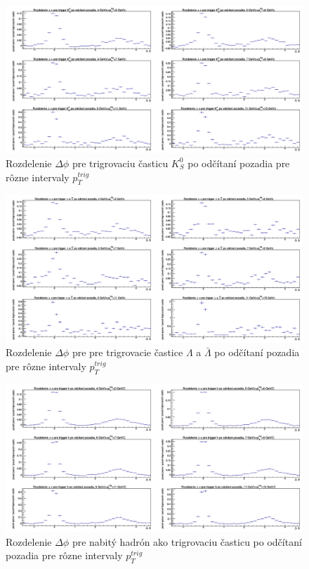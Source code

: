 \documentclass[thesismargins, thesislinespacing]{rnthesis}
\begin{document}
\begin{figure}[hbtp!]
	\centering
	\includegraphics[width=\textwidth]{./Obrazky_praca/DeltaPhiKH.png}
	\caption{Rozdelenie $\Delta \phi$ pre trigrovaciu časticu $K^0_S$ po odčítaní pozadia pre rôzne intervaly $p_T^{trig}$}
	\label{K0}
\end{figure}

\begin{figure}[hbtp!]
	\centering
	\includegraphics[width=\textwidth]{./Obrazky_praca/DeltaPhiLH.png}
	\caption{Rozdelenie $\Delta \phi$ pre pre trigrovacie častice $\Lambda$ a $\bar{\Lambda}$  po odčítaní pozadia pre rôzne intervaly $p_T^{trig}$}
	\label{lambda}
\end{figure}

\begin{figure}[hbtp!]
	\centering
	\includegraphics[width=\textwidth]{./Obrazky_praca/DeltaPhiHH.png}
	\caption{Rozdelenie $\Delta \phi$ pre nabitý hadrón ako trigrovaciu časticu po odčítaní pozadia pre rôzne intervaly $p_T^{trig}$}
	\label{hh}
\end{figure}
\newpage
\end{document}
